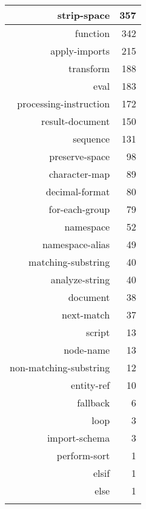 \begin{tabular}{|r|r|}
\hline
strip-space&357\\
\hline
function&342\\
\hline
apply-imports&215\\
\hline
transform&188\\
\hline
eval&183\\
\hline
processing-instruction&172\\
\hline
result-document&150\\
\hline
sequence&131\\
\hline
preserve-space&98\\
\hline
character-map&89\\
\hline
decimal-format&80\\
\hline
for-each-group&79\\
\hline
namespace&52\\
\hline
namespace-alias&49\\
\hline
matching-substring&40\\
\hline
analyze-string&40\\
\hline
document&38\\
\hline
next-match&37\\
\hline
script&13\\
\hline
node-name&13\\
\hline
non-matching-substring&12\\
\hline
entity-ref&10\\
\hline
fallback&6\\
\hline
loop&3\\
\hline
import-schema&3\\
\hline
perform-sort&1\\
\hline
elsif&1\\
\hline
else&1\\
\hline
&\\
\hline
\end{tabular}
\begin{tabular}{|r|r|}
\hline
\end{tabular}
